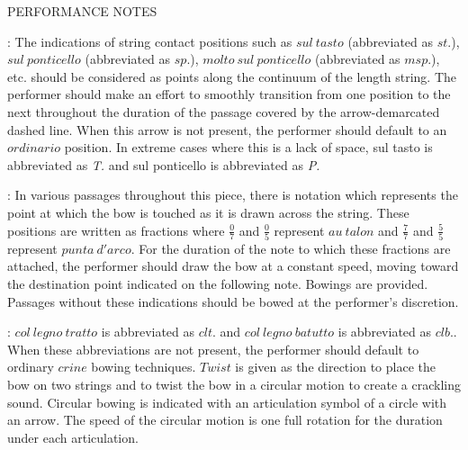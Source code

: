 \documentclass[11pt]{article}
\newcommand*\circled[1]{\tikz[baseline=(char.base)]{
            \node[shape=circle,draw,inner sep=1pt] (char) {#1};}}
\begin{document}
\begin{center}
\huge PERFORMANCE NOTES
\end{center}
\begingroup
\begin{center}

 : The indications of string contact positions such as $sul \ tasto$ (abbreviated as $st.$), $sul \ ponticello$ (abbreviated as $sp.$), $molto \ sul \ ponticello$ (abbreviated as $msp.$), etc. should be considered as points along the continuum of the length string. The performer should make an effort to smoothly transition from one position to the next throughout the duration of the passage covered by the arrow-demarcated dashed line. When this arrow is not present, the performer should default to an $ordinario$ position. In extreme cases where this is a lack of space, sul tasto is abbreviated as \textit{T.} and sul ponticello is abbreviated as \textit{P.} 
\rightskip\leftskip
\phantom{text} \hfill \phantom{()}

 : In various passages throughout this piece, there is notation which represents the point at which the bow is touched as it is drawn across the string. These positions are written as fractions where \( \frac{0}{7} \) and  \( \frac{0}{5} \) represent $au \ talon$ and \( \frac{7}{7} \) and \( \frac{5}{5} \) represent $punta \ d'arco$. For the duration of the note to which these fractions are attached, the performer should draw the bow at a constant speed, moving toward the destination point indicated on the following note. Bowings are provided. Passages without these indications should be bowed at the performer's discretion.
\rightskip\leftskip
\phantom{text} \hfill \phantom{()}

 : \circled{1} $col \ legno \ tratto$ is abbreviated as $clt.$ and \circled{2} $col \ legno \ batutto$ is abbreviated as $clb.$. When these abbreviations are not present, the performer should default to ordinary $crine$ bowing techniques. \circled{3} $Twist$ is given as the direction to place the bow on two strings and to twist the bow in a circular motion to create a crackling sound. \circled{4} Circular bowing is indicated with an articulation symbol of a circle with an arrow. The speed of the circular motion is one full rotation for the duration under each articulation.
\rightskip\leftskip
\phantom{text} \hfill \phantom{()}


\end{center}
\end{document}
